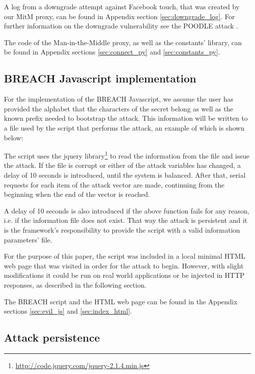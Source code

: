 A log from a downgrade attempt against Facebook touch, that was created by our
MitM proxy, can be found in Appendix section \ref{sec:downgrade_log}. For
further information on the downgrade vulnerability see the POODLE attack
\cite{poodle}.

The code of the Man-in-the-Middle proxy, as well as the constants' library, can
be found in Appendix sections \ref{sec:connect_py} and \ref{sec:constants_py}.

\subsection{BREACH Javascript implementation}

For the implementation of the BREACH Javascript, we assume the user has provided
the alphabet that the characters of the secret belong as well as the known
prefix needed to bootstrap the attack. This information will be written to a
file used by the script that performs the attack, an example of which is shown
below:


The script uses the jquery
library\footnote{\url{http://code.jquery.com/jquery-2.1.4.min.js}} to read the
information from the file and issue the attack. If the file is corrupt or either
of the attack variables has changed, a delay of 10 seconds is introduced, until
the system is balanced. After that, serial requests for each item of the attack
vector are made, continuing from the beginning when the end of the vector is
reached.

A delay of 10 seconds is also introduced if the above function fails for any
reason, i.e. if the information file does not exist. That way the attack is
persistent and it is the framework's responsibility to provide the script with a
valid information parameters' file.

For the purpose of this paper, the script was included in a local minimal HTML
web page that was visited in order for the attack to begin. However, with slight
modifications it could be run on real world applications or be injected in HTTP
responses, as described in the following section.

The BREACH script and the HTML web page can be found in the Appendix sections
\ref{sec:evil_js} and \ref{sec:index_html}.

\subsection{Attack persistence}\label{sec:persistence}

